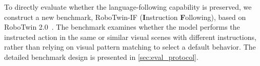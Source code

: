 To directly evaluate whether the language-following capability is preserved, we construct a new benchmark, RoboTwin-IF (\textbf{I}nstruction \textbf{F}ollowing), based on RoboTwin 2.0~\citep{chen2025robotwin}. 
The benchmark examines whether the model performs the instructed action in the same or similar visual scenes with different instructions, rather than relying on visual pattern matching to select a default behavior. 
The detailed benchmark design is presented in \cref{sec:eval_protocol}.






